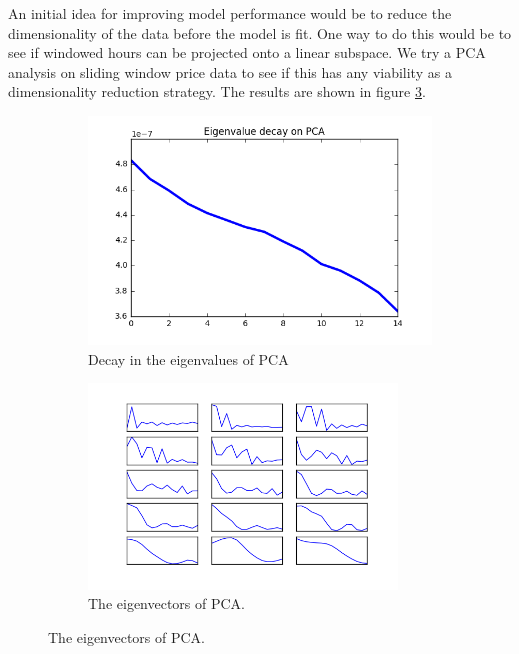 \documentclass{article}
\begin{document}
An initial idea for improving model performance would be to reduce the dimensionality
of the data before the model is fit. One way to do this would be to 
see if windowed hours can be projected onto a linear subspace.
We try a PCA analysis on sliding window price data to see if this
has any viability as a dimensionality reduction strategy. The results are shown
in figure \ref{fig:pca}. 

\begin{figure}[h]
	\centering
	\begin{subfigure}{.5\textwidth}
	  \centering
		\includegraphics[width=.9\textwidth]{eigenvals}
      \caption{Decay in the eigenvalues of PCA}
        \label{fig:evals}
	\end{subfigure}%
	\begin{subfigure}{.5\textwidth}
          \centering
		\includegraphics[width=0.9\textwidth]{pca_features}
		\caption{The eigenvectors of PCA.}
		\label{fig:pca}
	\end{subfigure}
\end{figure}
\end{document}
